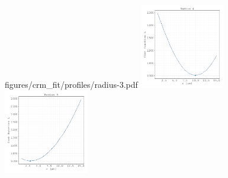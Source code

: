 \documentclass{article}
\begin{document}
\begin{figure}[H]
        {figures/crm_fit/profiles/radius-3.pdf}%
    \includegraphics[width=0.33\textwidth]
        {figures/crm_fit/profiles/radius-4.pdf}%
    \includegraphics[width=0.33\textwidth]
        {figures/crm_fit/profiles/radius-5.pdf}%
        \caption{}%
    \label{fig:parameter-estimates-supplement}
\end{figure}

\end{document}
